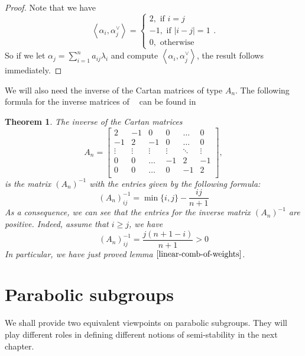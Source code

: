 \documentclass[12pt]{article} %
\newtheorem{theorem}[definition]{Theorem}
\DeclareMathOperator{\slnr}{\mathfrak{sl}_n(\mathbb{R})}
\begin{document}
\begin{proof}
    Note that we have
    \[\left\langle \alpha_i,\alpha_j^{\vee}\right\rangle = \begin{cases}
            2, \mbox{ if } i =j     \\
            -1, \mbox{ if } |i-j|=1 \\
            0, \mbox{ otherwise }
        \end{cases}. \]
    So if we let $\alpha_j = \sum_{i=1}^n a_{ij}\lambda_i$ and compute $\left\langle \alpha_i,\alpha_j^{\vee}\right\rangle$, the result follows immediately.
\end{proof}
We will also need the inverse of the Cartan matrices of type $A_n$. The following formula for the 
inverse matrices of $\slnr$ can be found in \cite{}
\begin{theorem}
The inverse of the Cartan matrices
\[A_n = \begin{bmatrix}
        2      & -1     & 0      & 0      & \ldots & 0      \\
        -1     & 2      & -1     & 0      & \ldots & 0      \\
        \vdots & \vdots & \vdots & \vdots & \ddots & \vdots \\
        0      & 0      & \ldots & -1     & 2      & -1     \\
        0      & 0      & \ldots & 0      & -1     & 2      \\
    \end{bmatrix},\]
    is the matrix $(A_n)^{-1}$ with the entries given by the following formula:
    \[(A_n)^{-1}_{ij} = \min\{i,j\}-\dfrac{ij}{n+1}\]
As a consequence, we can see that the entries for the inverse matrix $(A_n)^{-1}$ are positive. Indeed, assume that 
$i \ge j$, we have 
\[(A_n)^{-1}_{ij} = \dfrac{j(n+1-i)}{n+1}>0\]
In particular, we have just proved lemma $\ref{linear-comb-of-weights}$.
\end{theorem}
\section{Parabolic subgroups}
We shall provide two equivalent viewpoints on parabolic subgroups. They will play different roles in defining
different notions of semi-stability in the next chapter.
\end{document}
